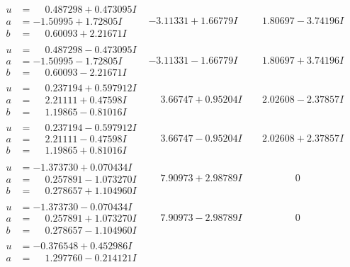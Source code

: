 \documentclass[1p]{elsarticle_modified}
\theoremstyle{definition}
\begin{document}
$$\begin{array}{c|c|c}
\begin{aligned}
u &= \phantom{-}0.487298 + 0.473095 I \\
a &= -1.50995 + 1.72805 I \\
b &= \phantom{-}0.60093 + 2.21671 I\end{aligned}
 & -3.11331 + 1.66779 I & \phantom{-}1.80697 - 3.74196 I \\ \hline\begin{aligned}
u &= \phantom{-}0.487298 - 0.473095 I \\
a &= -1.50995 - 1.72805 I \\
b &= \phantom{-}0.60093 - 2.21671 I\end{aligned}
 & -3.11331 - 1.66779 I & \phantom{-}1.80697 + 3.74196 I \\ \hline\begin{aligned}
u &= \phantom{-}0.237194 + 0.597912 I \\
a &= \phantom{-}2.21111 + 0.47598 I \\
b &= \phantom{-}1.19865 - 0.81016 I\end{aligned}
 & \phantom{-}3.66747 + 0.95204 I & \phantom{-}2.02608 - 2.37857 I \\ \hline\begin{aligned}
u &= \phantom{-}0.237194 - 0.597912 I \\
a &= \phantom{-}2.21111 - 0.47598 I \\
b &= \phantom{-}1.19865 + 0.81016 I\end{aligned}
 & \phantom{-}3.66747 - 0.95204 I & \phantom{-}2.02608 + 2.37857 I \\ \hline\begin{aligned}
u &= -1.373730 + 0.070434 I \\
a &= \phantom{-}0.257891 - 1.073270 I \\
b &= \phantom{-}0.278657 + 1.104960 I\end{aligned}
 & \phantom{-}7.90973 + 2.98789 I & \phantom{-0.000000 } 0 \\ \hline\begin{aligned}
u &= -1.373730 - 0.070434 I \\
a &= \phantom{-}0.257891 + 1.073270 I \\
b &= \phantom{-}0.278657 - 1.104960 I\end{aligned}
 & \phantom{-}7.90973 - 2.98789 I & \phantom{-0.000000 } 0 \\ \hline\begin{aligned}
u &= -0.376548 + 0.452986 I \\
a &= \phantom{-}1.297760 - 0.214121 I \\

\end{aligned}
\end{array}$$
\end{document}
